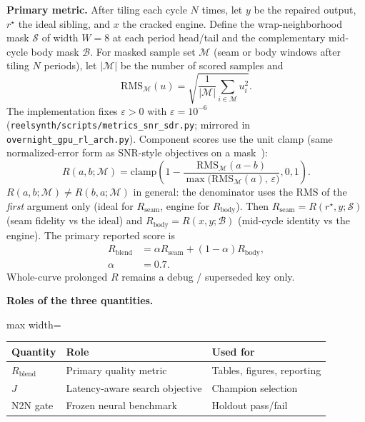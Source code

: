 \textbf{Primary metric.}
After tiling each cycle $N$ times, let $y$ be the repaired output, $r^{\star}$ the ideal sibling, and $x$ the cracked engine.
Define the wrap-neighborhood mask $\mathcal{S}$ of width $W{=}8$ at each period head/tail and the complementary mid-cycle body mask $\mathcal{B}$.
For masked sample set $\mathcal{M}$ (seam or body windows after tiling $N$ periods), let $|\mathcal{M}|$ be the number of scored samples and
\begin{equation}
\mathrm{RMS}_{\mathcal{M}}(u)=\sqrt{\frac{1}{|\mathcal{M}|}\sum_{i\in\mathcal{M}} u_i^2}.
\end{equation}
The implementation fixes $\varepsilon>0$ with $\varepsilon=10^{-6}$ (\texttt{reelsynth/scripts/metrics\_snr\_sdr.py}; mirrored in \texttt{overnight\_gpu\_rl\_arch.py}).
Component scores use the unit clamp (same normalized-error form as SNR-style objectives on a mask~\cite{purwins2019}):
\begin{equation}
\label{eq:R-component}
R(a,b;\mathcal{M})
=\mathrm{clamp}\!\left(
  1-\frac{\mathrm{RMS}_{\mathcal{M}}(a-b)}
         {\max\!\bigl(\mathrm{RMS}_{\mathcal{M}}(a),\,\varepsilon\bigr)},
  0,1\right).
\end{equation}
$R(a,b;\mathcal{M})\neq R(b,a;\mathcal{M})$ in general: the denominator uses the RMS of the \emph{first} argument only (ideal for $R_{\mathrm{seam}}$, engine for $R_{\mathrm{body}}$).
Then $R_{\mathrm{seam}}=R(r^{\star},y;\mathcal{S})$ (seam fidelity vs the ideal) and
$R_{\mathrm{body}}=R(x,y;\mathcal{B})$ (mid-cycle identity vs the engine).
The primary reported score is
\begin{equation}
\label{eq:R-blend}
\begin{aligned}
R_{\mathrm{blend}}
&=\alpha R_{\mathrm{seam}}+(1-\alpha)R_{\mathrm{body}},\\
\alpha&=0.7.
\end{aligned}
\end{equation}
Whole-curve prolonged $R$ remains a debug / superseded key only.

\textbf{Roles of the three quantities.}
\begin{center}
\small
\begin{adjustbox}{max width=\columnwidth}
\begin{tabular}{@{}lll@{}}
\toprule
Quantity & Role & Used for \\
\midrule
$R_{\mathrm{blend}}$ & Primary quality metric & Tables, figures, reporting \\
$J$ & Latency-aware search objective & Champion selection \\
N2N gate & Frozen neural benchmark & Holdout pass/fail \\
\bottomrule
\end{tabular}
\end{adjustbox}
\end{center}

